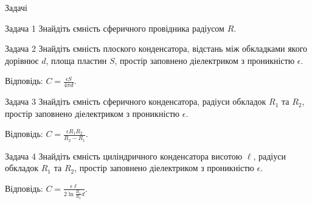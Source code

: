 \documentclass[onlytextwidth]{beamer}
\begin{document}
\begin{frame}{Задачі}{}\scriptsize
	\begin{exampleblock}{\scriptsize Задача 1}
		Знайдіть ємність сферичного провідника радіусом $R$.
	\end{exampleblock}
	\begin{exampleblock}{\scriptsize Задача 2}
		Знайдіть ємність плоского конденсатора, відстань між обкладками якого дорівнює $d$,
		площа пластин $S$, простір заповнено діелектриком з проникністю $\epsilon$.

		\bigskip

		Відповідь: $C = \frac{\epsilon S}{4\pi d}$.
	\end{exampleblock}
	\begin{exampleblock}{\scriptsize Задача 3}
		Знайдіть ємність сферичного конденсатора, радіуси обкладок $R_1$ та $R_2$, простір
		заповнено діелектриком з проникністю $\epsilon$.

		\bigskip

		Відповідь: $C = \frac{\epsilon R_1R_2}{R_2 - R_1}$.
	\end{exampleblock}
	\begin{exampleblock}{\scriptsize Задача 4}
		Знайдіть ємність циліндричного конденсатора висотою $\ell$, радіуси обкладок $R_1$ та
		$R_2$, простір
		заповнено діелектриком з проникністю $\epsilon$.

		\bigskip

		Відповідь: $C = \frac{\epsilon \ell}{2\ln\frac{R_1}{R_2} d}$.
	\end{exampleblock}
\end{frame}
\end{document}
